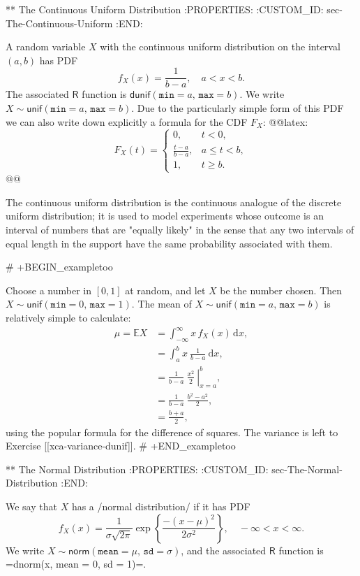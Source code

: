 ** The Continuous Uniform Distribution
:PROPERTIES:
:CUSTOM_ID: sec-The-Continuous-Uniform
:END:

A random variable \(X\) with the continuous uniform distribution on
the interval \((a,b)\) has PDF
\begin{equation}
f_{X}(x)=\frac{1}{b-a}, \quad a < x < b.
\end{equation}
The associated \(\mathsf{R}\) function is
\(\mathsf{dunif}(\mathtt{min}=a,\,\mathtt{max}=b)\). We write
\(X\sim\mathsf{unif}(\mathtt{min}=a,\,\mathtt{max}=b)\). Due to the
particularly simple form of this PDF we can also write down explicitly
a formula for the CDF \(F_{X}\): @@latex:\begin{equation} \label{eq-unif-cdf} F_{X}(t) = \begin{cases} 0, & t < 0,\\ \frac{t-a}{b-a}, & a\leq t < b,\\ 1, & t \geq b. \end{cases} \end{equation}@@

The continuous uniform distribution is the continuous analogue of the
discrete uniform distribution; it is used to model experiments whose
outcome is an interval of numbers that are "equally likely" in the
sense that any two intervals of equal length in the support have the
same probability associated with them.

# +BEGIN_exampletoo

Choose a number in \( [0,1] \) at random, and let \(X\) be the number
chosen. Then \(X\sim\mathsf{unif}(\mathtt{min}=0,\,\mathtt{max}=1)\).
The mean of \(X\sim\mathsf{unif}(\mathtt{min}=a,\,\mathtt{max}=b)\) is
relatively simple to calculate:
\begin{align*}
\mu=\mathbb{E} X & =\int_{-\infty}^{\infty}x\, f_{X}(x)\,\mathrm{d} x,\\
 & =\int_{a}^{b}x\ \frac{1}{b-a}\ \mathrm{d} x,\\
 & =\left.\frac{1}{b-a}\ \frac{x^{2}}{2}\ \right|_{x=a}^{b},\\
 & =\frac{1}{b-a}\ \frac{b^{2}-a^{2}}{2},\\
 & =\frac{b+a}{2},
\end{align*}
using the popular formula for the difference of squares. The variance
is left to Exercise [[xca-variance-dunif]].
# +END_exampletoo

** The Normal Distribution
:PROPERTIES:
:CUSTOM_ID: sec-The-Normal-Distribution
:END:

We say that \(X\) has a /normal distribution/ if it has PDF
\begin{equation}
f_{X}(x)=\frac{1}{\sigma\sqrt{2\pi}}\exp \left\{ \frac{-(x-\mu)^{2}}{2\sigma^{2}} \right\},\quad -\infty < x < \infty.
\end{equation}
We write
\(X\sim\mathsf{norm}(\mathtt{mean}=\mu,\,\mathtt{sd}=\sigma)\), and
the associated \(\mathsf{R}\) function is =dnorm(x, mean = 0, sd =
1)=.

